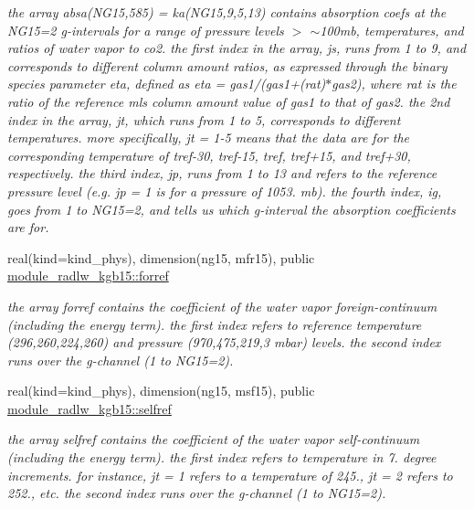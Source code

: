 \begin{Indent}
\begin{DoxyCompactItemize}
\begin{DoxyCompactList}\small\item\em the array absa(\+N\+G15,585) = ka(\+N\+G15,9,5,13) contains absorption coefs at the N\+G15=2 g-\/intervals for a range of pressure levels $>$ $\sim$100mb, temperatures, and ratios of water vapor to co2. the first index in the array, js, runs from 1 to 9, and corresponds to different column amount ratios, as expressed through the binary species parameter eta, defined as eta = gas1/(gas1+(rat)$\ast$gas2), where rat is the ratio of the reference mls column amount value of gas1 to that of gas2. the 2nd index in the array, jt, which runs from 1 to 5, corresponds to different temperatures. more specifically, jt = 1-\/5 means that the data are for the corresponding temperature of tref-\/30, tref-\/15, tref, tref+15, and tref+30, respectively. the third index, jp, runs from 1 to 13 and refers to the reference pressure level (e.\+g. jp = 1 is for a pressure of 1053. mb). the fourth index, ig, goes from 1 to N\+G15=2, and tells us which g-\/interval the absorption coefficients are for. \end{DoxyCompactList}\item 
real(kind=kind\+\_\+phys), dimension(ng15, mfr15), public \hyperlink{group__module__radlw__kgbnn_gada70146d20f89f059141aa4cf58a0894}{module\+\_\+radlw\+\_\+kgb15\+::forref}
\begin{DoxyCompactList}\small\item\em the array forref contains the coefficient of the water vapor foreign-\/continuum (including the energy term). the first index refers to reference temperature (296,260,224,260) and pressure (970,475,219,3 mbar) levels. the second index runs over the g-\/channel (1 to N\+G15=2). \end{DoxyCompactList}\item 
real(kind=kind\+\_\+phys), dimension(ng15, msf15), public \hyperlink{group__module__radlw__kgbnn_ga1d14e9b2e607f2022d84c6fc0cd27c4e}{module\+\_\+radlw\+\_\+kgb15\+::selfref}
\begin{DoxyCompactList}\small\item\em the array selfref contains the coefficient of the water vapor self-\/continuum (including the energy term). the first index refers to temperature in 7. degree increments. for instance, jt = 1 refers to a temperature of 245., jt = 2 refers to 252., etc. the second index runs over the g-\/channel (1 to N\+G15=2). \end{DoxyCompactList}\item 

\end{DoxyCompactItemize}
\end{Indent}
